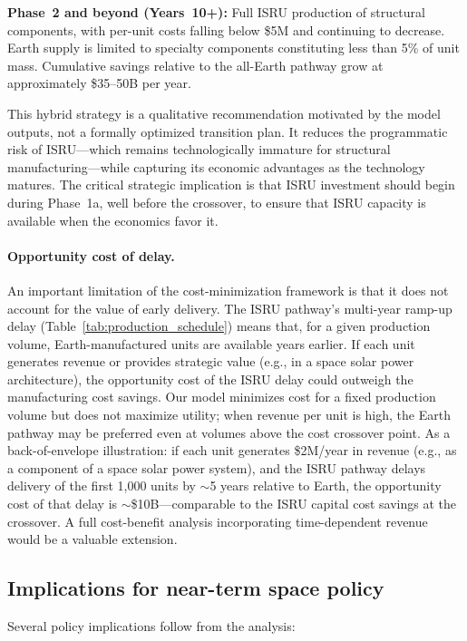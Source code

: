 \documentclass[preprint,12pt]{elsarticle}
\begin{document}
\textbf{Phase~2 and beyond (Years~10+):} Full ISRU production of structural components, with per-unit costs falling below \$5M and continuing to decrease. Earth supply is limited to specialty components constituting less than 5\% of unit mass. Cumulative savings relative to the all-Earth pathway grow at approximately \$35--50B per year.

This hybrid strategy is a qualitative recommendation motivated by the model outputs, not a formally optimized transition plan. It reduces the programmatic risk of ISRU---which remains technologically immature for structural manufacturing---while capturing its economic advantages as the technology matures. The critical strategic implication is that ISRU investment should begin during Phase~1a, well before the crossover, to ensure that ISRU capacity is available when the economics favor it.

\paragraph{Opportunity cost of delay.} An important limitation of the cost-minimization framework is that it does not account for the value of early delivery. The ISRU pathway's multi-year ramp-up delay (Table~\ref{tab:production_schedule}) means that, for a given production volume, Earth-manufactured units are available years earlier. If each unit generates revenue or provides strategic value (e.g., in a space solar power architecture), the opportunity cost of the ISRU delay could outweigh the manufacturing cost savings. Our model minimizes cost for a fixed production volume but does not maximize utility; when revenue per unit is high, the Earth pathway may be preferred even at volumes above the cost crossover point. As a back-of-envelope illustration: if each unit generates \$2M/year in revenue (e.g., as a component of a space solar power system), and the ISRU pathway delays delivery of the first 1{,}000 units by $\sim$5 years relative to Earth, the opportunity cost of that delay is $\sim$\$10B---comparable to the ISRU capital cost savings at the crossover. A full cost-benefit analysis incorporating time-dependent revenue would be a valuable extension.

\subsection{Implications for near-term space policy}

Several policy implications follow from the analysis:
\end{document}
